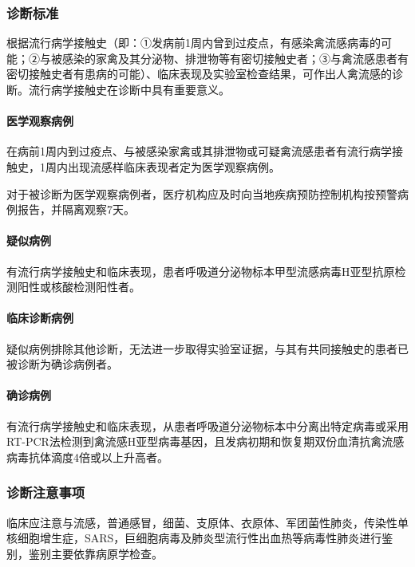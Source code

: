 \subsubsection{诊断标准}

根据流行病学接触史（即：①发病前1周内曾到过疫点，有感染禽流感病毒的可能；②与被感染的家禽及其分泌物、排泄物等有密切接触史者；③与禽流感患者有密切接触史者有患病的可能）、临床表现及实验室检查结果，可作出人禽流感的诊断。流行病学接触史在诊断中具有重要意义。

\paragraph{医学观察病例}

在病前1周内到过疫点、与被感染家禽或其排泄物或可疑禽流感患者有流行病学接触史，1周内出现流感样临床表现者定为医学观察病例。

对于被诊断为医学观察病例者，医疗机构应及时向当地疾病预防控制机构按预警病例报告，并隔离观察7天。

\paragraph{疑似病例}

有流行病学接触史和临床表现，患者呼吸道分泌物标本甲型流感病毒H亚型抗原检测阳性或核酸检测阳性者。

\paragraph{临床诊断病例}

疑似病例排除其他诊断，无法进一步取得实验室证据，与其有共同接触史的患者已被诊断为确诊病例者。

\paragraph{确诊病例}

有流行病学接触史和临床表现，从患者呼吸道分泌物标本中分离出特定病毒或采用RT-PCR法检测到禽流感H亚型病毒基因，且发病初期和恢复期双份血清抗禽流感病毒抗体滴度4倍或以上升高者。

\subsubsection{诊断注意事项}

临床应注意与流感，普通感冒，细菌、支原体、衣原体、军团菌性肺炎，传染性单核细胞增生症，SARS，巨细胞病毒及肺炎型流行性出血热等病毒性肺炎进行鉴别，鉴别主要依靠病原学检查。

